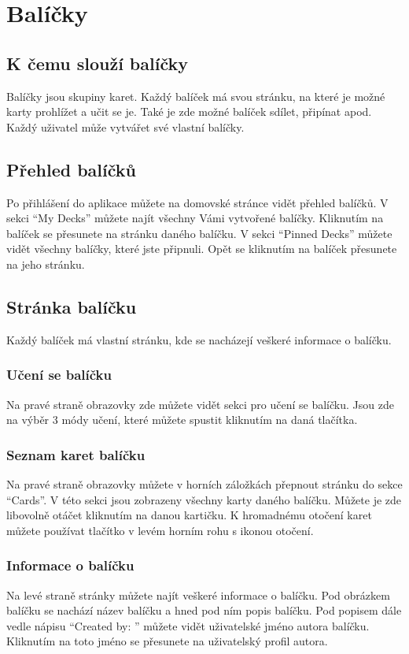 \documentclass[a4paper,12pt]{article}
\begin{document}
\section{Balíčky}
\subsection{K čemu slouží balíčky}
Balíčky jsou skupiny karet. Každý balíček má svou stránku, na které je možné karty prohlížet a učit se je. Také je zde možné balíček sdílet, připínat apod. Každý uživatel může vytvářet své vlastní balíčky.

\subsection{Přehled balíčků}
Po přihlášení do aplikace můžete na domovské stránce vidět přehled balíčků. V sekci \enquote{My Decks} můžete najít všechny Vámi vytvořené balíčky. Kliknutím na balíček se přesunete na stránku daného balíčku. V sekci \enquote{Pinned Decks} můžete vidět všechny balíčky, které jste připnuli. Opět se kliknutím na balíček přesunete na jeho stránku.

\subsection{Stránka balíčku}
Každý balíček má vlastní stránku, kde se nacházejí veškeré informace o balíčku.

\subsubsection*{Učení se balíčku}
Na pravé straně obrazovky zde můžete vidět sekci pro učení se balíčku. Jsou zde na výběr 3 módy učení, které můžete spustit kliknutím na daná tlačítka.

\subsubsection*{Seznam karet balíčku}
Na pravé straně obrazovky můžete v horních záložkách přepnout stránku do sekce \enquote{Cards}. V této sekci jsou zobrazeny všechny karty daného balíčku. Můžete je zde libovolně otáčet kliknutím na danou kartičku. K hromadnému otočení karet můžete používat tlačítko v levém horním rohu s ikonou otočení.

\subsubsection*{Informace o balíčku}
Na levé straně stránky můžete najít veškeré informace o balíčku. Pod obrázkem balíčku se nachází název balíčku a hned pod ním popis balíčku. Pod popisem dále vedle nápisu \enquote{Created by: } můžete vidět uživatelské jméno autora balíčku. Kliknutím na toto jméno se přesunete na uživatelský profil autora.
\end{document}
